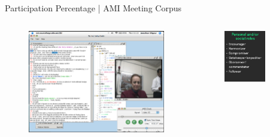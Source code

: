 \documentclass{beamer}
\begin{document}
    \begin{frame}{Participation Percentage | AMI Meeting Corpus}
    
            \begin{columns}
                \begin{column}{0.50\textwidth}
                    \begin{figure}
                        \includegraphics[width=\textwidth]{images/ami.png}
                    \end{figure}
                \end{column}
                \begin{column}{0.50\textwidth}
                    \begin{figure}
                        \includegraphics[width=0.7\textwidth]{images/roles.png}
                    \end{figure}
                \end{column}
            \end{columns}\\
    

\end{frame}
\end{document}

